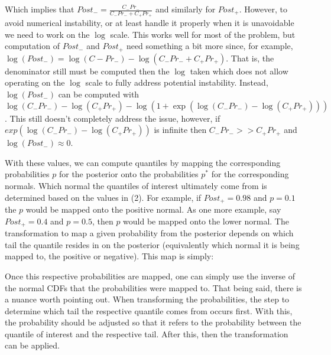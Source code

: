 Which implies that $Post_- = \frac{C_{-} Pr_{-}}{C_{-} Pr_{-} + C_{+} Pr_{+}}$ and similarly for $Post_+$. However, to avoid numerical instability, or at least handle it properly when it is unavoidable we need to work on the $\log$ scale. This works well for most of the problem, but computation of $Post_-$ and $Post_+$ need something a bit more since, for example, $\log(Post_-) = \log(C{-}Pr_{-}) - \log(C_{-} Pr_{-} + C_{+} Pr_{+})$. That is, the denominator still must be computed then the $\log$ taken which does not allow operating on the $\log$ scale to fully address potential instability. Instead, $\log(Post_-)$ can be computed with $\log(C_-Pr_-) -  \log(C_+Pr_+) - \log(1 + \exp(\log(C_-Pr_-) -  \log(C_+Pr_+)))$. This still doesn't completely address the issue, however, if $exp(\log(C_-Pr_-) -  \log(C_+Pr_+))$ is infinite then $C_-Pr_- >> C_+Pr_+$ and $\log(Post_-) \approx 0$.

With these values, we can compute quantiles by mapping the corresponding probabilities $p$ for the posterior onto the probabilities $p^*$ for the corresponding normals. Which normal the quantiles of interest ultimately come from is determined based on the values in (2). For example, if $Post_{+} = 0.98$ and $p = 0.1$ the $p$ would be mapped onto the positive normal. As one more example, say $Post_{+} = 0.4$ and $p = 0.5$, then $p$ would be mapped onto the lower normal. The transformation to map a given probability from the posterior depends on which tail the quantile resides in on the posterior (equivalently which normal it is being mapped to, the positive or negative). This map is simply:


Once this respective probabilities are mapped, one can simply use the inverse of the normal CDFs that the probabilities were mapped to. That being said, there is a nuance worth pointing out. When transforming the probabilities, the step to determine which tail the respective quantile comes from occurs first. With this, the probability should be adjusted so that it refers to the probability between the quantile of interest and the respective tail. After this, then the transformation can be applied.

